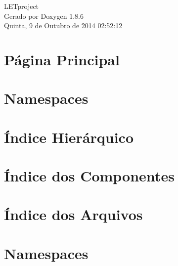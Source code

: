 \documentclass[twoside]{article}
\begin{document}
\hypersetup{pageanchor=false}
\begin{titlepage}
\vspace*{7cm}
\begin{center}%
{\Large L\-E\-Tproject }\\
\vspace*{1cm}
{\large Gerado por Doxygen 1.8.6}\\
\vspace*{0.5cm}
{\small Quinta, 9 de Outubro de 2014 02:52:12}\\
\end{center}
\end{titlepage}
\tableofcontents
{}
\hypersetup{pageanchor=true}

\section{Página Principal}
\label{index}\hypertarget{index}{}
\section{Namespaces}

\section{Índice Hierárquico}

\section{Índice dos Componentes}

\section{Índice dos Arquivos}

\section{Namespaces}






























\end{document}
